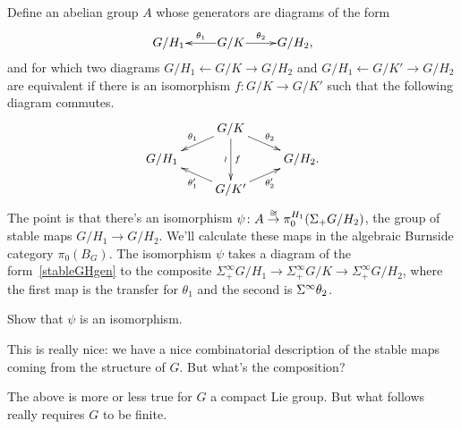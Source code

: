 Define an abelian group $A$ whose generators are diagrams of the form
\begin{equation}
\label{stableGHgen}
\xymatrix@1{
	G/H_1 & G/K\ar[l]_-{\theta_1}\ar[r]^-{\theta_2} & G/H_2,
}
\end{equation}
and for which two diagrams $G/H_1\gets G/K\to G/H_2$ and $G/H_1\gets G/K'\to G/H_2$ are equivalent if there is an
isomorphism $f\colon G/K\to G/K'$ such that the following diagram commutes.
\[\xymatrix@R=0.3cm{
	& G/K\ar[dd]_\wr^f\ar[dr]^{\theta_2}\ar[dl]_{\theta_1}\\
	G/H_1 && G/H_2.\\
	& G/K'\ar[ul]^{\theta_1'}\ar[ur]_{\theta_2'}
}\]
The point is that there's an isomorphism $\psi\colon A\stackrel\cong\to\pi_0^{H_1}(\Sigma_+ G/H_2)$, the group of stable maps
$G/H_1\to G/H_2$. We'll calculate these maps in the algebraic Burnside category $\pi_0(B_G)$. The isomorphism
$\psi$ takes a diagram of the form~\eqref{stableGHgen} to the composite $\Sigma_+^\infty G/H_1\to \Sigma_+^\infty
G/K\to\Sigma_+^\infty G/H_2$, where the first map is the transfer for $\theta_1$ and the second is
$\Sigma^\infty\theta_2$.
\begin{ex}
Show that $\psi$ is an isomorphism.
\end{ex}
This is really nice: we have a nice combinatorial description of the stable maps coming from the structure of $G$.
But what's the composition?

The above is more or less true for $G$ a compact Lie group. But what follows really requires $G$ to be finite.

